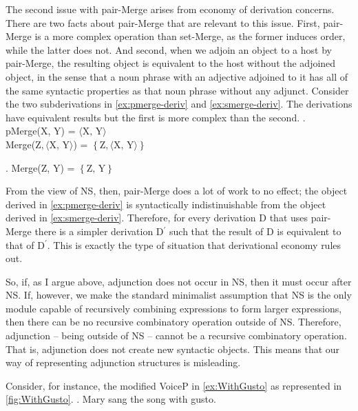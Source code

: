 \documentclass[MilwayThesis]{subfiles}
\begin{document}
The second issue with pair-Merge arises from economy of derivation concerns.
There are two facts about pair-Merge that are relevant to this issue.
First, pair-Merge is a more complex operation than set-Merge, as the former induces order, while the latter does not.
And second, when we adjoin an object to a host by pair-Merge, the resulting object is equivalent to the host without the adjoined object, in the sense that a noun phrase with an adjective adjoined to it has all of the same syntactic properties as that noun phrase without any adjunct.
Consider the two subderivations in \cref{ex:pmerge-deriv} and \cref{ex:smerge-deriv}.
The derivations have equivalent results but the first is more complex than the second.
\ex.\label{ex:pmerge-deriv} pMerge(X, Y) = $\langle\text{X, Y}\rangle$\\
Merge(Z$, \langle\text{X, Y}\rangle$) = $\left\{ \text{Z}, \langle\text{X, Y}\rangle \right\}$

\ex.\label{ex:smerge-deriv} Merge(Z, Y) = $\left\{ \text{Z, Y} \right\}$

From the view of NS, then, pair-Merge does a lot of work to no effect; the object derived in \cref{ex:pmerge-deriv} is syntactically indistinuishable from the object derived in \cref{ex:smerge-deriv}.
Therefore, for every derivation D that uses pair-Merge there is a simpler derivation D$^\prime$ such that the result of D is equivalent to that of D$^\prime$.
This is exactly the type of situation that derivational economy rules out.

So, if, as I argue above, adjunction does not occur in NS, then it must occur after NS.
If, however, we make the standard minimalist assumption that NS is the only module capable of recursively combining expressions to form larger expressions, then there can be no recursive combinatory operation outside of NS.
Therefore, adjunction -- being outside of NS -- cannot be a recursive combinatory operation. 
That is, adjunction does not create new syntactic objects.
This means that our way of representing adjunction structures is misleading.

Consider, for instance, the modified VoiceP in \cref{ex:WithGusto} as represented in \cref{fig:WithGusto}.
\ex. Mary sang the song with gusto.\label{ex:WithGusto}
\end{document}
